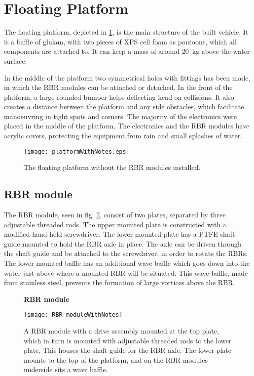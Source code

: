 \section{Floating Platform}
The floating platform, depicted in
\cref{fig:floatingPlatform}, is the main structure of the built vehicle.
It is a baffle of glulam, with two pieces of XPS cell foam as
pontoons, which all components are attached to. It can keep a mass of
around 20~kg above the water surface.%

In the middle of the platform two symmetrical holes with fittings has
been made, in which the RBR modules can be attached or detached. In the front of the platform, a large rounded bumper helps deflecting head on collisions. It also creates a distance between the platform and
any side obstacles, which facilitate manoeuvring in tight spots and corners. The majority of the electronics were placed in the middle of the platform. The electronics and the RBR modules have acrylic
covers, protecting the equipment from rain and small splashes of water.

\begin{figure}[h]
   \centering
   \texttt{[image: platformWithNotes.eps]}
   \caption{The floating platform without the RBR modules installed.}
   \label{fig:floatingPlatform}
\end{figure}

\subsection{RBR module}
The RBR module, seen in fig. \ref{fig:rbr-module}, consist of two plates, separated by three adjustable threaded
rods. The upper mounted plate is constructed with a modified hand-held screwdriver. The lower mounted
plate has a PTFE shaft guide mounted to hold the RBR axle in place. The axle can be driven through the shaft guide and be attached to the screwdriver, in order to rotate the RBRs. The lower mounted baffle has an
additional wave baffle which goes down into the water just above where a mounted RBR
will be situated. This wave baffle, made from stainless steel, prevents the formation of large vortices above the RBR. 

\begin{figure}[H]
  \centering
  \textbf{RBR module}
  \par\medskip
  \texttt{[image: RBR-moduleWithNotes]}
  \caption{A RBR module with a drive assembly mounted at the top plate,
    which in turn is mounted with adjustable threaded rods to the lower plate. This houses the shaft guide for the RBR axle. The lower plate mounts to the
    top of the platform, and on the RBR modules underside sits a wave baffle.}\label{fig:rbr-module}
\end{figure}

